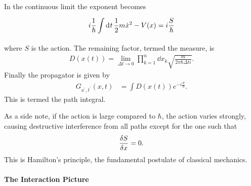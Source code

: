 In the continuous limit the exponent becomes
\begin{align*}
	i\frac{1}{\hbar}\int\limits_{}^{}\dd[]{t}\frac{1}{2}m\dot{x}^{2} - V(x) = i\frac{S}{\hbar}
\end{align*}
where $S$ is the action. The remaining factor, termed the measure, is
\begin{align*}
	D(x(t)) = \lim\limits_{\Delta t \to 0}\prod\limits_{k = 1}^{n}\dd{x_{k}}\sqrt{\frac{m}{2\pi\hbar\Delta ti}}.
\end{align*}
Finally the propagator is given by
\begin{align*}
	G_{x^{\prime}, t^{\prime}}(x, t) &= \int D(x(t))e^{-i\frac{S}{\hbar}}.
\end{align*}
This is termed the path integral.

As a side note, if the action is large compared to $\hbar$, the action varies strongly, causing destructive interference from all paths except for the one such that
\begin{align*}
	\fdv{S}{x} = 0.
\end{align*}
This is Hamilton's principle, the fundamental postulate of classical mechanics.

\paragraph{The Interaction Picture}
